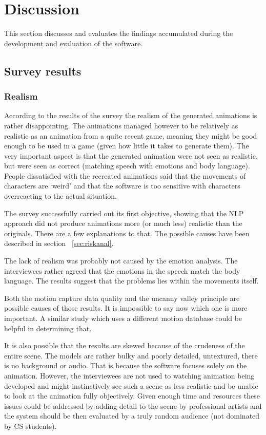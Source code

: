 \chapter{Discussion \label{chap:discussion}}
This section discusses and evaluates the findings accumulated during the development and evaluation of the software.

\section{Survey results}

\subsection{Realism}
According to the results of the survey the realism of the generated animations is rather disappointing. The animations managed however to be relatively as realistic as an animation from a quite recent game, meaning they might be good enough to be used in a game (given how little it takes to generate them). The very important aspect is that the generated animation were not seen as realistic, but were seen as correct (matching speech with emotions and body language). People dissatisfied with the recreated animations said that the movements of characters are `weird' and that the software is too sensitive with characters overreacting to the actual situation. 

The survey successfully carried out its first objective, showing that the NLP approach did not produce animations more (or much less) realistic than the originals. There are a few explanations to that. The possible causes have been described in section ~\ref{sec:riskanal}.

The lack of realism was probably not caused by the emotion analysis. The interviewees rather agreed that the emotions in the speech match the body language. The results suggest that the problems lies within the movements itself. 

Both the motion capture data quality and the uncanny valley principle are possible causes of those results. It is impossible to say now which one is more important. A similar study which uses a different motion database could be helpful in determining that.

It is also possible that the results are skewed because of the crudeness of the entire scene. The models are rather bulky and poorly detailed, untextured, there is no background or audio. That is because the software focuses solely on the animation. However, the interviewees are not used to watching animation being developed and might instinctively see such a scene as less realistic and be unable to look at the animation fully objectively. Given enough time and resources these issues could be addressed by adding detail to the scene by professional artists and the system should be then evaluated by a truly random audience (not dominated by CS students).

